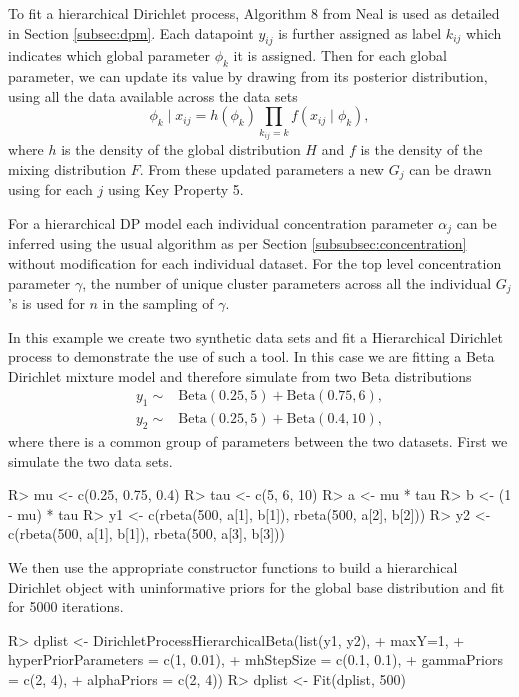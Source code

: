 \documentclass[nojss]{jss}
\begin{document}
To fit a hierarchical Dirichlet process, Algorithm 8 from Neal is used as detailed in Section \ref{subsec:dpm}. Each datapoint $y_{ij}$ is further assigned as label $k_{ij}$ which indicates which global parameter $\phi _k$ it is assigned. Then for each global parameter, we can update its value by drawing from its posterior distribution, using all the data available across the data sets
\begin{equation}
\phi _k \mid x_{ij} = h(\phi _k) \prod _{k_{ij} = k} f(x_{ij} \mid \phi _k ) ,
\label{eq:hierposterior}
\end{equation}
where $h$ is the density of the global distribution $H$ and $f$ is the density of the mixing distribution $F$. From these updated parameters a new $G_j$ can be drawn using for each $j$ using Key Property 5.

For a hierarchical DP model each individual concentration parameter $\alpha _j$ can be inferred using the usual algorithm as per Section \ref{subsubsec:concentration} without modification for each individual dataset. For the top level concentration parameter $\gamma$, the number of unique cluster parameters across all the individual $G_j$'s is used for $n$ in the sampling of $\gamma$.

In this example we create two synthetic data sets and fit a Hierarchical Dirichlet process to demonstrate the use of such a tool. In this case we are fitting a Beta Dirichlet mixture model and therefore simulate from two Beta distributions
\begin{align*}
y_1 \sim & \text{Beta}(0.25, 5) + \text{Beta}(0.75, 6), \\
y_2 \sim & \text{Beta}(0.25, 5) + \text{Beta}(0.4, 10),
\end{align*}
where there is a common group of parameters between the two datasets. First we simulate the two data sets.
\newpage %
\begin{Schunk}
\begin{Sinput}
R> mu <- c(0.25, 0.75, 0.4)
R> tau <- c(5, 6, 10)
R> a <- mu * tau
R> b <- (1 - mu) * tau
R> y1 <- c(rbeta(500, a[1], b[1]), rbeta(500, a[2], b[2]))
R> y2 <- c(rbeta(500, a[1], b[1]), rbeta(500, a[3], b[3]))
\end{Sinput}
\end{Schunk}
We then use the appropriate constructor functions to build a hierarchical Dirichlet object with uninformative priors for the global base distribution and fit for 5000 iterations.
\begin{Schunk}
\begin{Sinput}
R> dplist <- DirichletProcessHierarchicalBeta(list(y1, y2),
+                                             maxY=1,
+                                             hyperPriorParameters = c(1, 0.01),
+                                             mhStepSize = c(0.1, 0.1),
+                                             gammaPriors = c(2, 4),
+                                             alphaPriors = c(2, 4))
R> dplist <- Fit(dplist, 500)
\end{Sinput}
\end{Schunk}
\end{document}
